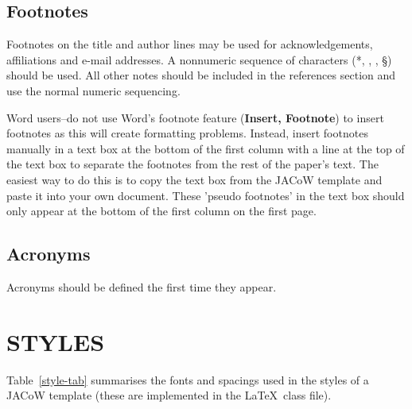 \documentclass{JAC2003}
\begin{document}
\subsection{Footnotes}

Footnotes on the title and author lines may be used for acknowledgements,
affiliations and e-mail addresses. A nonnumeric sequence of characters (*,
\dag, \ddag, \S) should be used. All other notes should be included in the
references section and use the normal numeric sequencing.

Word users--do not use Word's footnote feature (\textbf{Insert, Footnote}) to insert
footnotes as this will create formatting problems. Instead, insert footnotes manually in a text box at the bottom of the first column with a line at the top of the text box to separate the footnotes from the rest of the paper's text.  The easiest way to do this is to copy the text box from the JACoW template and paste it into your own document.  These 'pseudo footnotes' in the text box should only appear at the bottom of the first column on the first page.

\subsection{Acronyms}

Acronyms should be defined the first time they appear.

\section{STYLES}

Table~\ref{style-tab} summarises the fonts and spacings used in the styles of
a JACoW template (these are implemented in the \LaTeX\ class file).
\end{document}
